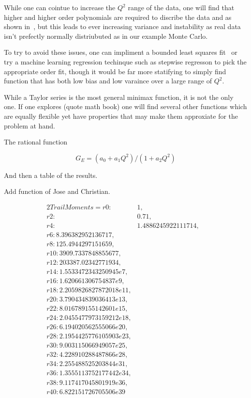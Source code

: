 \documentclass[10pt,aps,prc,twocolumn]{revtex4-1}
\begin{document}
While one can cointue to increase the $Q^2$ range of the data, one will find that higher and higher order polynomials are required
to discribe the data and as shown in~\cite{Kraus:2014qua}, but this leads to ever increasing variance and instability as real data
isn't prefectly normally distriubuted as in our example Monte Carlo.

To try to avoid these issues, one can impliment a bounded least squares fit~\cite{} or try a machine learning regression techinque
such as stepwise regresson to pick the appropriate order fit, though it would be far more statifying to simply find function that has 
both low bias and low varaince over a large range of $Q^2$.

While a Taylor series is the most general minimax function, it is not the only one.    If one explores (quote math book) one 
will find several other functions which are equally flexible yet have properties that may make them approxiate for the 
problem at hand.

The rational function

\begin{equation}
G_E = (a_0 + a_1 Q^2)/(1 + a_2 Q^2)
\end{equation}

And then a table of the results.

Add function of Jose and Christian.

\begin{alignat*}{2}
Trail Moments=
r0:&  1,\\
r2:&  0.71,&\\
r4:&  1.4886245922111714,&\\
r6:  8.396382952136717,&\\
r8:  125.4944297151659,&\\
r10: 3909.7337848855677,\\
r12: 203387.02342771934,\\
r14: 1.5533472343250945e7,\\
r16: 1.620661306754837e9,\\
r18: 2.2059826827872018e11,\\
r20: 3.790434839036413e13,\\
r22: 8.016789155142601e15,\\
r24: 2.0455477973159212e18,\\
r26: 6.194020562555066e20, \\
r28: 2.1954425776105903e23, \\
r30: 9.003115066949057e25, \\
r32: 4.228910288487866e28, \\
r34: 2.255488525203844e31, \\
r36: 1.3555113752177442e34, \\
r38: 9.117417045801919e36, \\
r40: 6.822151726705506e39 
\end{alignat*}
\end{document}
